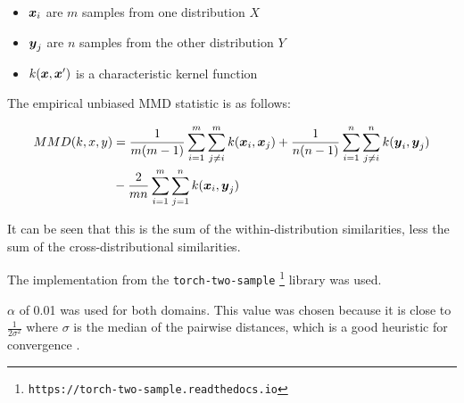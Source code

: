 \begin{itemize}
    \item $\boldsymbol{x}_i$ are $m$ samples from one distribution  $X$
    \item $\boldsymbol{y}_j$ are $n$ samples from the other distribution $Y$
    \item $k(\boldsymbol{x}, \boldsymbol{x}')$ is a characteristic kernel function
\end{itemize}

The empirical unbiased MMD statistic is as follows:

\begin{equation}
\label{eq:mmd}
\begin{split}
MMD (k, x, y) &= \frac{1}{m(m-1)} \sum_{i=1}^m \sum_{j \neq i}^m k(\boldsymbol{x}_i, \boldsymbol{x}_j) + \frac{1}{n(n-1)} \sum_{i=1}^n \sum_{j \neq i}^n k(\boldsymbol{y}_i, \boldsymbol{y}_j) \\
&- \frac{2}{mn} \sum_{i=1}^m \sum_{j=1}^n k(\boldsymbol{x}_i, \boldsymbol{y}_j)
\end{split}
\end{equation}

It can be seen that this is the sum of the within-distribution similarities, less the sum of the cross-distributional similarities. 


The implementation from the \texttt{torch-two-sample} \footnote{\texttt{https://torch-two-sample.readthedocs.io}} library \cite{torchtwosample} was used.

$\alpha$ of 0.01 was used for both domains. This value was chosen because it is close to $\frac{1}{2 \sigma^2}$ where $\sigma$ is the median of the pairwise distances, which is a good heuristic for convergence \cite{Garreau2017LargeSA} .  


